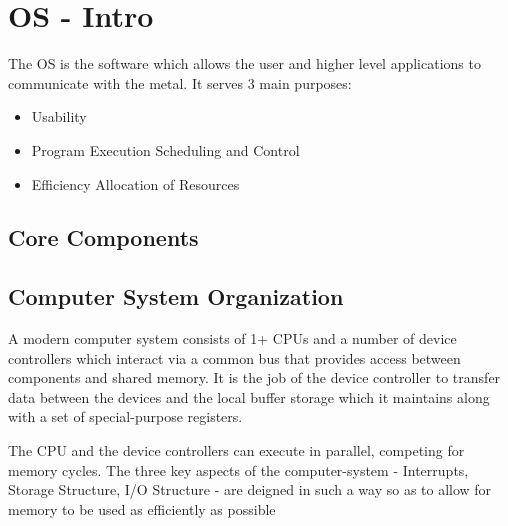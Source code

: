 
\section{OS - Intro}


\par{The OS is the software which allows the user and higher level applications to communicate with the metal. It serves 3 main purposes:}

\begin{itemize}
	\item Usability
	\item Program Execution Scheduling and Control
	\item Efficiency Allocation of Resources
\end{itemize}

\subsection{Core Components}





\subsection{Computer System Organization}


	\par{A modern computer system consists of 1+ CPUs and a number of device controllers which interact via a common bus that provides access between components and shared memory. It is the job of the device controller to transfer data between the devices and the local buffer storage which it maintains along with a set of special-purpose registers.}
	\par{The CPU and the device controllers can execute in parallel, competing for memory cycles. The three key aspects of the computer-system - Interrupts, Storage Structure, I/O Structure - are deigned in such a way so as to allow for memory to be used as efficiently as possible }

